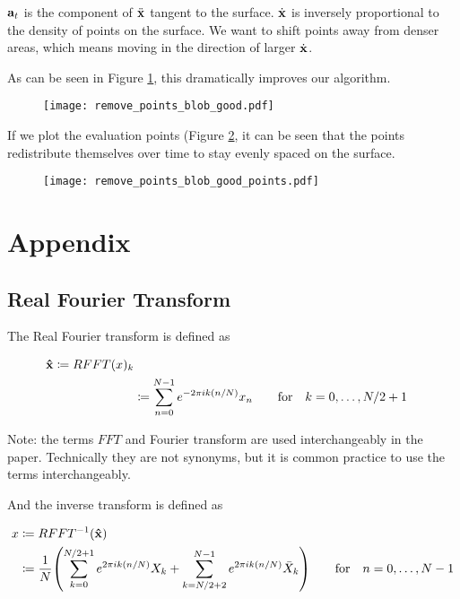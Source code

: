 $\mathbf{a}_t$ is the component of $\ddot{\mathbf{x}}$ tangent to the surface. $\dot{\mathbf{x}}$ is inversely proportional to the density of points on the surface. We want to shift points away from denser areas, which means moving in the direction of larger $\dot{\mathbf{x}}$.

As can be seen in Figure \ref{fig:remove-points-blob-good}, this dramatically improves our algorithm.

\begin{figure}[H]
    \begin{center}
      \texttt{[image: remove\_points\_blob\_good.pdf]}
    \end{center}
  \vspace{-.2in} %
  \caption{\label{fig:remove-points-blob-good}}
\end{figure}

If we plot the evaluation points (Figure \ref{fig:remove-points-blob-good-points}, it can be seen that the points redistribute themselves over time to stay evenly spaced on the surface.

\begin{figure}[H]
    \begin{center}
      \texttt{[image: remove\_points\_blob\_good\_points.pdf]}
    \end{center}
  \vspace{-.2in} %
  \caption{\label{fig:remove-points-blob-good-points}}
\end{figure}


\section*{Appendix}

\subsection*{Real Fourier Transform}

The Real Fourier transform is defined as

\begin{align*}
  \mathbf{\hat{x}} \coloneqq RFFT(x)_k\\
  & \coloneqq \sum_{n=0}^{N-1} e^{-2\pi i k (n/N)} x_n \qquad \text{for} \quad k = 0, \dotsc, N/2+1
\end{align*}

Note: the terms $FFT$ and Fourier transform are used interchangeably in the paper. Technically they are not synonyms, but it is common practice to use the terms interchangeably.

And the inverse transform is defined as

\begin{align*}
  x& \coloneqq RFFT^{-1}(\bhat{x})\\
  & \coloneqq \frac{1}{N} \paren{\sum_{k=0}^{N/2+1} e^{2\pi i k (n/N)} X_k + \sum_{k=N/2+2}^{N-1} e^{2\pi i k (n/N)} \bar{X}_k} \qquad \text{for} \quad n = 0, \dotsc, N-1
\end{align*}